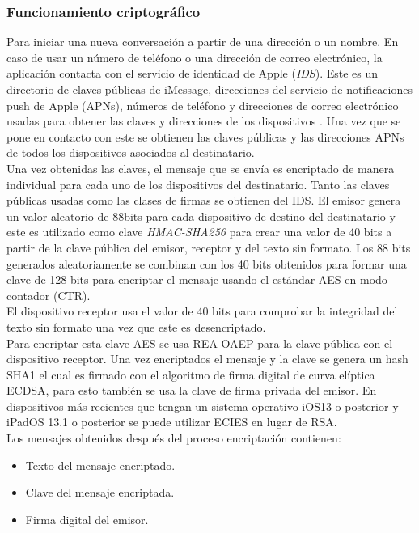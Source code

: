 \subsubsection{Funcionamiento criptográfico}
Para iniciar una nueva conversación a partir de una dirección o un nombre. En caso de usar un número de teléfono o una dirección de correo electrónico, la aplicación contacta con el servicio de identidad de Apple (\emph{IDS}). Este es un directorio de claves públicas de iMessage, direcciones del servicio de notificaciones push de Apple (APNs), números de teléfono y direcciones de correo electrónico usadas para obtener las claves y direcciones de los dispositivos \cite{ids}. Una vez que se pone en contacto con este se obtienen las claves públicas y las direcciones APNs de todos los dispositivos asociados al destinatario.\\
Una vez obtenidas las claves, el mensaje que se envía es encriptado de manera individual para cada uno de los dispositivos del destinatario. Tanto las claves públicas usadas como las clases de firmas se obtienen del IDS. El emisor genera un valor aleatorio de 88bits para cada dispositivo de destino del destinatario y este es utilizado como clave \emph{HMAC-SHA256} para crear una valor de 40 bits a partir de la clave pública del emisor, receptor y del texto sin formato. Los 88 bits generados aleatoriamente se combinan con los 40 bits obtenidos para formar una clave de 128 bits para encriptar el mensaje usando el estándar AES en modo contador (CTR).\\
El dispositivo receptor usa el valor de 40 bits para comprobar la integridad del texto sin formato una vez que este es desencriptado.\\
Para encriptar esta clave AES se usa REA-OAEP para la clave pública con el dispositivo receptor. Una vez encriptados el mensaje y la clave se genera un hash SHA1 el cual es firmado con el algoritmo de firma digital de curva elíptica ECDSA, para esto también se usa la clave de firma privada del emisor. En dispositivos más recientes que tengan un sistema operativo iOS13 o posterior y iPadOS 13.1 o posterior se puede utilizar ECIES en lugar de RSA.\\
Los mensajes obtenidos después del proceso encriptación contienen:
\begin{itemize}
	\item Texto del mensaje encriptado.
	\item Clave del mensaje encriptada.
	\item Firma digital del emisor.
\end{itemize}
